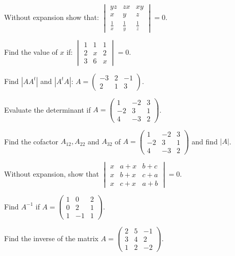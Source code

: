\documentclass[11pt,a4paper]{article}
\begin{document}
\begin{shortlist}
\item Without expansion show that: $\begin{vmatrix}yz & zx & xy\\ x & y & z\\ \frac{1}{x} & \frac{1}{y} & \frac{1}{z}\end{vmatrix}=0$.

\item Find the value of $x$ if: $\begin{vmatrix}1 & 1 & 1\\ 2 & x & 2\\ 3 & 6 & x\end{vmatrix}=0$.

\item Find $|AA^t|$ and $|A^tA|$: $A=\begin{pmatrix}-3 & 2 & -1\\ 2 & 1 & 3\end{pmatrix}$.

\item Evaluate the determinant if $A=\begin{pmatrix}1 & -2 & 3\\ -2 & 3 & 1\\ 4 & -3 & 2\end{pmatrix}$.

\item Find the cofactor $A_{12},A_{22}$ and $A_{32}$ of $A=\begin{pmatrix}1 & -2 & 3\\ -2 & 3 & 1\\ 4 & -3 & 2\end{pmatrix}$ and find $|A|$.

\item Without expansion, show that $\begin{vmatrix}x & a+x & b+c\\ x & b+x & c+a\\ x & c+x & a+b\end{vmatrix}=0$.

\item Find $A^{-1}$ if $A=\begin{pmatrix}1 & 0 & 2\\ 0 & 2 & 1\\ 1 & -1 & 1\end{pmatrix}$.

\item Find the inverse of the matrix $A=\begin{pmatrix}2 & 5 & -1\\ 3 & 4 & 2\\ 1 & 2 & -2\end{pmatrix}$.


\end{shortlist}
\end{document}
